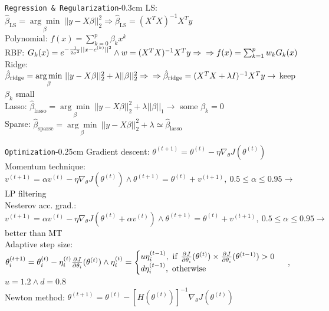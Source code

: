 \documentclass[10pt,3col]{cheatsheet}
\begin{document}
\begin{multicols}{3}

\begin{cheatsheetbox}{\texttt{Regression \& Regularization}}{-0.3cm}
    LS: $\hat{\beta}_\mathrm{LS} = \underset{\beta}{\arg\min} \ ||y - X\beta||_2^2 \Rightarrow \hat{\beta}_\mathrm{LS} = (X^TX)^{-1}X^Ty$\\
    Polynomial: $f(x) = \sum_{k=0}^p \beta_kx^k$\\
    RBF: $G_k(x) = e^{-\frac{1}{2\sigma^2}||x-c^{(k)}||^2} \wedge w = (X^TX)^{-1}X^Ty \Rightarrow \\ \Rightarrow f(x) = \sum_{k=1}^p w_k G_k(x)$\\
    Ridge: $\hat{\beta}_\mathrm{ridge} = \underset{\beta}{\arg\min} \ ||y - X\beta||_2^2 + \lambda ||\beta||^2_2 \Rightarrow \\ \Rightarrow \hat{\beta}_\mathrm{ridge} = (X^TX + \lambda I)^{-1}X^Ty \rightarrow$ keep $\beta_k$ small\\
    Lasso: $\hat{\beta}_\mathrm{lasso} = \underset{\beta}{\arg\min} \ ||y - X\beta||_2^2 + \lambda ||\beta||_1 \rightarrow$ some $\beta_k = 0$\\
    Sparse: $\hat{\beta}_\mathrm{sparse} = \underset{\beta}{\arg\min} \ ||y - X\beta||_2^2 + \lambda \simeq \hat{\beta}_\mathrm{lasso}$
\end{cheatsheetbox}

\begin{cheatsheetbox}{\texttt{Optimization}}{-0.25cm}
    Gradient descent: $\theta^{(t+1)} = \theta^{(t)} - \eta \nabla_\theta J(\theta^{(t)})$\\
    Momentum technique: $v^{(t+1)} = \alpha v^{(t)} - \eta \nabla_\theta J(\theta^{(t)}) \wedge \theta^{(t+1)} = \theta^{(t)} + v^{(t+1)}, \ 0.5 \leq \alpha \leq 0.95 \rightarrow$ LP filtering\\
    Nesterov acc. grad.: $v^{(t+1)} = \alpha v^{(t)} - \eta \nabla_\theta J(\theta^{(t)} + \alpha v^{(t)}) \wedge \theta^{(t+1)} = \theta^{(t)} + v^{(t+1)}, \ 0.5 \leq \alpha \leq 0.95 \rightarrow $ better than MT\\
    Adaptive step size: {\scriptsize $\theta^{(t+1)}_i = \theta^{(t)}_i - \eta_i^{(t)} \frac{\partial J}{\partial \theta_i}(\theta^{(t)}) \wedge \\ \eta_i^{(t)} =  \begin{cases} u \eta_i^{(t-1)}, \ \mathrm{if} \ \frac{\partial J}{\partial \theta_i}(\theta^{(t)}) \times \frac{\partial J}{\partial \theta_i}(\theta^{(t - 1)}) > 0\\ d \eta_i^{(t - 1)}, \ \mathrm{otherwise} \end{cases}$} \hspace{-0.5cm} {\scriptsize, $u = 1.2 \wedge d = 0.8$}\\
    Newton method: $\theta^{(t+1)} = \theta^{(t)} - \left[H(\theta^{(t)})\right]^{-1} \nabla_\theta J(\theta^{(t)})$
\end{cheatsheetbox}


\end{multicols}
\end{document}
